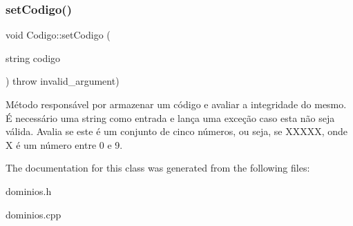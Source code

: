 \subsubsection{\texorpdfstring{set\+Codigo()}{setCodigo()}}
{\footnotesize\ttfamily void Codigo\+::set\+Codigo (\begin{DoxyParamCaption}\item[{string}]{codigo }\end{DoxyParamCaption}) throw  invalid\+\_\+argument) }

Método responsável por armazenar um código e avaliar a integridade do mesmo. É necessário uma string como entrada e lança uma exceção caso esta não seja válida. Avalia se este é um conjunto de cinco números, ou seja, se X\+X\+X\+XX, onde X é um número entre 0 e 9. 

The documentation for this class was generated from the following files\+:\begin{DoxyCompactItemize}
\item 
dominios.\+h\item 
dominios.\+cpp\end{DoxyCompactItemize}
